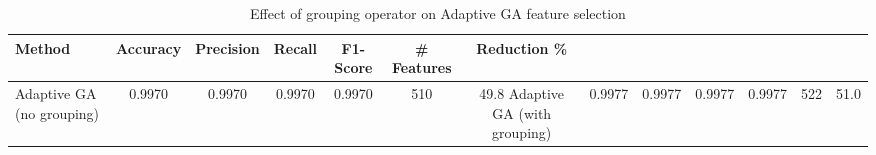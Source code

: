 \begin{table}[htbp]
\centering
\caption{Effect of grouping operator on Adaptive GA feature selection}
\label{tab:table7}
\begin{tabular}{lcccccc}
\toprule
Method & Accuracy & Precision & Recall & F1-Score & \# Features & Reduction \% \\
\midrule
Adaptive GA (no grouping) & 0.9970 & 0.9970 & 0.9970 & 0.9970 & 510 & 49.8%
Adaptive GA (with grouping) & 0.9977 & 0.9977 & 0.9977 & 0.9977 & 522 & 51.0%
\bottomrule
\end{tabular}
\end{table}
